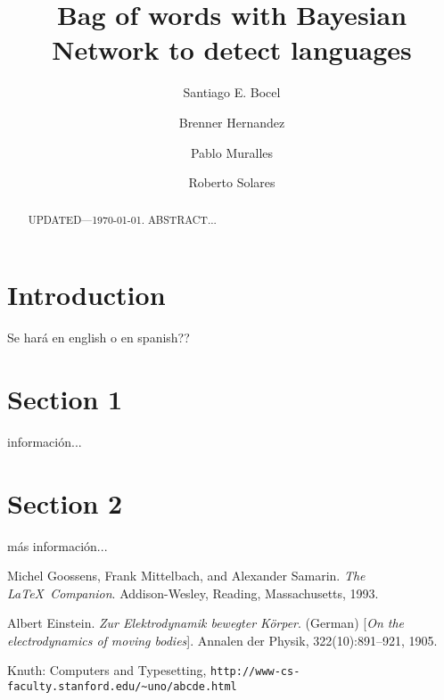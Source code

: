 \documentclass{acmart}
\title{Bag of words with Bayesian Network to detect languages}
\author{Santiago E. Bocel}
\author{Brenner Hernandez}
\author{Pablo Muralles}
\author{Roberto Solares}
\affiliation{%
    \institution{Universidad Rafael Landívar}
    \postcode{01016}
    \city{Guatemala City}
    \country{Guatemala}}
\begin{document}
    \begin{abstract}
    UPDATED---\today. ABSTRACT...
    \end{abstract}

    \maketitle

    \section{Introduction}
    Se hará en english o en spanish??

    \section{Section 1}
    información...

    \section{Section 2}
    más información...

    \begin{thebibliography}{9}

    Michel Goossens, Frank Mittelbach, and Alexander Samarin. 
    \textit{The \LaTeX\ Companion}. 
    Addison-Wesley, Reading, Massachusetts, 1993.

    Albert Einstein. 
    \textit{Zur Elektrodynamik bewegter K{\"o}rper}. (German) 
    [\textit{On the electrodynamics of moving bodies}]. 
    Annalen der Physik, 322(10):891–921, 1905.

    Knuth: Computers and Typesetting,
    \texttt{http://www-cs-faculty.stanford.edu/\~{}uno/abcde.html}
    \end{thebibliography}
\end{document}
